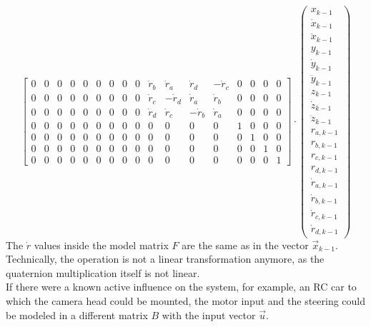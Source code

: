 \begin{equation*}
\begin{bmatrix}
        0 & 0 & 0 & 0 & 0 & 0 & 0 & 0 & 0 & \dot{r}_{b} &  \dot{r}_{a} &  \dot{r}_{d} & -\dot{r}_{c} & 0 & 0 & 0 & 0 \\
        0 & 0 & 0 & 0 & 0 & 0 & 0 & 0 & 0 & \dot{r}_{c} & -\dot{r}_{d} &  \dot{r}_{a} &  \dot{r}_{b} & 0 & 0 & 0 & 0 \\
        0 & 0 & 0 & 0 & 0 & 0 & 0 & 0 & 0 & \dot{r}_{d} &  \dot{r}_{c} & -\dot{r}_{b} &  \dot{r}_{a} & 0 & 0 & 0 & 0 \\
        0 & 0 & 0 & 0 & 0 & 0 & 0 & 0 & 0 & 0 & 0 & 0 & 0 & 1 & 0 & 0 & 0 \\
        0 & 0 & 0 & 0 & 0 & 0 & 0 & 0 & 0 & 0 & 0 & 0 & 0 & 0 & 1 & 0 & 0 \\
        0 & 0 & 0 & 0 & 0 & 0 & 0 & 0 & 0 & 0 & 0 & 0 & 0 & 0 & 0 & 1 & 0 \\
        0 & 0 & 0 & 0 & 0 & 0 & 0 & 0 & 0 & 0 & 0 & 0 & 0 & 0 & 0 & 0 & 1
    \end{bmatrix} 
    \cdot 
    \begin{pmatrix}
        x_{k-1}\\
        \dot{x}_{k-1}\\
        \ddot{x}_{k-1}\\
        y_{k-1}\\
        \dot{y}_{k-1}\\
        \ddot{y}_{k-1}\\
        z_{k-1}\\
        \dot{z}_{k-1}\\
        \ddot{z}_{k-1}\\
        r_{a,k-1}\\
        r_{b,k-1}\\
        r_{c,k-1}\\
        r_{d,k-1}\\
        \dot{r}_{a,k-1}\\
        \dot{r}_{b,k-1}\\
        \dot{r}_{c,k-1}\\
        \dot{r}_{d,k-1}
    \end{pmatrix}
\end{equation*}
The $\dot{r}$ values inside the model matrix $F$ are the same as in the vector $\vec{x}_{k-1}$. Technically, the operation is not a linear transformation anymore, as the quaternion multiplication itself is not linear.\\
If there were a known active influence on the system, for example, an RC car to which the camera head could be mounted, the motor input and the steering could be modeled in a different matrix $B$ with the input vector $\vec{u}$.
